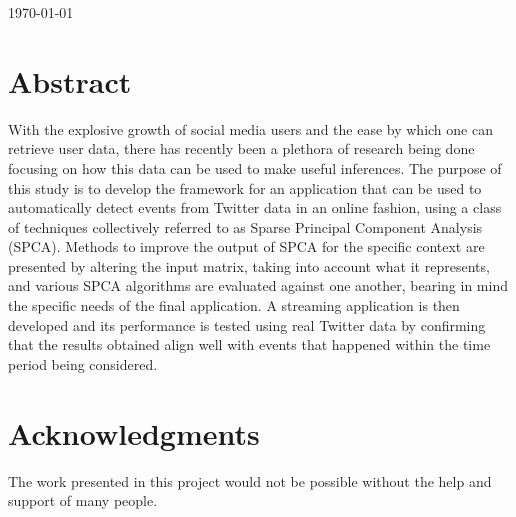 \documentclass[11pt,a4paper]{article}
\begin{document}
\begin{titlepage}

{\large \today}\\[3cm] %

\vfill %

\end{titlepage}





\newpage




\section*{\center Abstract}

With the explosive growth of social media users and the ease by which one can retrieve user data, there has recently been a plethora of research being done focusing on how this data can be used to make useful inferences. The purpose of this study is to develop the framework for an application that can be used to automatically detect events from Twitter data in an online fashion, using a class of techniques collectively referred to as Sparse Principal Component Analysis (SPCA). Methods to improve the output of SPCA for the specific context are presented by altering the input matrix, taking into account what it represents, and various SPCA algorithms are evaluated against one another, bearing in mind the specific needs of the final application. A streaming application is then developed and its performance is tested using real Twitter data by confirming that the results obtained align well with events that happened within the time period being considered. 

\clearpage
\section*{\center Acknowledgments}
The work presented in this project would not be possible without the help and support of many people. 
\end{document}
